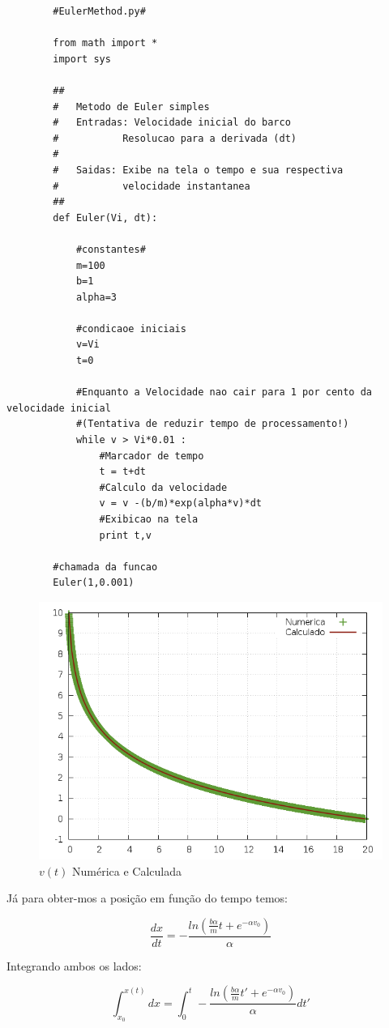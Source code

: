 \documentclass[a4paper,12pt]{article}
\begin{document}
		
		\begin{lstlisting}
		#EulerMethod.py#
		
		from math import *
		import sys

		##
		#	Metodo de Euler simples
		#	Entradas: Velocidade inicial do barco
		#			Resolucao para a derivada (dt)
		#
		#	Saidas: Exibe na tela o tempo e sua respectiva
		#			velocidade instantanea
		##
		def Euler(Vi, dt):
			
			#constantes#
			m=100
			b=1
			alpha=3
	
			#condicaoe iniciais
			v=Vi 
			t=0
			
			#Enquanto a Velocidade nao cair para 1 por cento da velocidade inicial
			#(Tentativa de reduzir tempo de processamento!)
			while v > Vi*0.01 :		
				#Marcador de tempo
				t = t+dt
				#Calculo da velocidade
				v = v -(b/m)*exp(alpha*v)*dt
				#Exibicao na tela
				print t,v
		
		#chamada da funcao
		Euler(1,0.001)
		\end{lstlisting}
		
		\begin{figure}[h]
			\centering
			\includegraphics[scale=0.6]{3o1.png}
			\caption{$v(t)$ Numérica e Calculada}
		\end{figure}
		
		Já para obter-mos a posição em função do tempo temos:
		
		\[\frac{dx}{dt}=-\frac{ln(\frac{b \alpha}{m} t + e^{-\alpha v_0})}{\alpha}\]
		
		Integrando ambos os lados:
		
		\[\int_{x_0}^{x(t)}dx=\int_0^t-\frac{ln(\frac{b \alpha}{m}t'+e^{-\alpha v_0})}{\alpha}dt'\]
		
\end{document}
